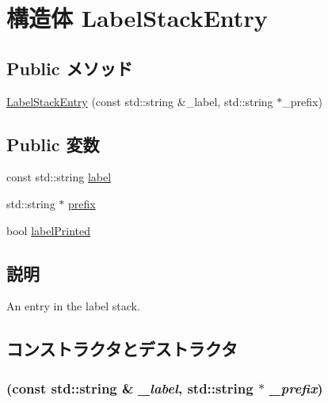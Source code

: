 \hypertarget{structPacket_1_1PrintReqState_1_1LabelStackEntry}{
\section{構造体 LabelStackEntry}
\label{structPacket_1_1PrintReqState_1_1LabelStackEntry}
}
\subsection*{Public メソッド}
\begin{DoxyCompactItemize}
\item 
\hyperlink{structPacket_1_1PrintReqState_1_1LabelStackEntry_aed7364376d59ea5dbd1a4d6cf6496118}{LabelStackEntry} (const std::string \&\_\-label, std::string $\ast$\_\-prefix)
\end{DoxyCompactItemize}
\subsection*{Public 変数}
\begin{DoxyCompactItemize}
\item 
const std::string \hyperlink{structPacket_1_1PrintReqState_1_1LabelStackEntry_ae471a4c4073716b769170188214fe93d}{label}
\item 
std::string $\ast$ \hyperlink{structPacket_1_1PrintReqState_1_1LabelStackEntry_a7cea951e64ac35a854019b66b9105b19}{prefix}
\item 
bool \hyperlink{structPacket_1_1PrintReqState_1_1LabelStackEntry_a22c23d7ca10090672c77c87d2f1e0a15}{labelPrinted}
\end{DoxyCompactItemize}


\subsection{説明}
An entry in the label stack. 

\subsection{コンストラクタとデストラクタ}
\hypertarget{structPacket_1_1PrintReqState_1_1LabelStackEntry_aed7364376d59ea5dbd1a4d6cf6496118}{
\subsubsection[{LabelStackEntry}]{ (const std::string \& {\em \_\-label}, \/  std::string $\ast$ {\em \_\-prefix})}}
\label{structPacket_1_1PrintReqState_1_1LabelStackEntry_aed7364376d59ea5dbd1a4d6cf6496118}



